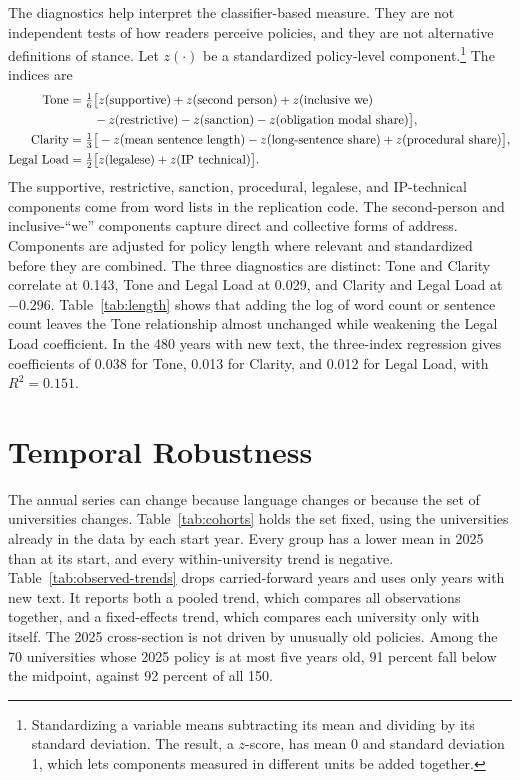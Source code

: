 \documentclass[11pt]{article}
\begin{document}
The diagnostics help interpret the classifier-based measure. They are not independent tests of how readers perceive policies, and they are not alternative definitions of stance. Let $z(\cdot)$ be a standardized policy-level component.\footnote{Standardizing a variable means subtracting its mean and dividing by its standard deviation. The result, a $z$-score, has mean 0 and standard deviation 1, which lets components measured in different units be added together.} The indices are
\begin{align}
\text{Tone} &= \tfrac{1}{6}\big[z(\text{supportive}) + z(\text{second person}) + z(\text{inclusive we}) \notag\\
&\qquad - z(\text{restrictive}) - z(\text{sanction}) - z(\text{obligation modal share})\big],\\
\text{Clarity} &= \tfrac{1}{3}\big[-z(\text{mean sentence length}) - z(\text{long-sentence share}) + z(\text{procedural share})\big],\\
\text{Legal Load} &= \tfrac{1}{2}\big[z(\text{legalese}) + z(\text{IP technical})\big].
\end{align}
The supportive, restrictive, sanction, procedural, legalese, and IP-technical components come from word lists in the replication code. The second-person and inclusive-``we'' components capture direct and collective forms of address. Components are adjusted for policy length where relevant and standardized before they are combined. The three diagnostics are distinct: Tone and Clarity correlate at 0.143, Tone and Legal Load at 0.029, and Clarity and Legal Load at $-0.296$. Table~\ref{tab:length} shows that adding the log of word count or sentence count leaves the Tone relationship almost unchanged while weakening the Legal Load coefficient. In the 480 years with new text, the three-index regression gives coefficients of 0.038 for Tone, 0.013 for Clarity, and 0.012 for Legal Load, with $R^2 = 0.151$.



\section{Temporal Robustness}\label{app:temporal}
\setcounter{table}{0}

The annual series can change because language changes or because the set of universities changes. Table~\ref{tab:cohorts} holds the set fixed, using the universities already in the data by each start year. Every group has a lower mean in 2025 than at its start, and every within-university trend is negative. Table~\ref{tab:observed-trends} drops carried-forward years and uses only years with new text. It reports both a pooled trend, which compares all observations together, and a fixed-effects trend, which compares each university only with itself. The 2025 cross-section is not driven by unusually old policies. Among the 70 universities whose 2025 policy is at most five years old, 91 percent fall below the midpoint, against 92 percent of all 150.
\end{document}
